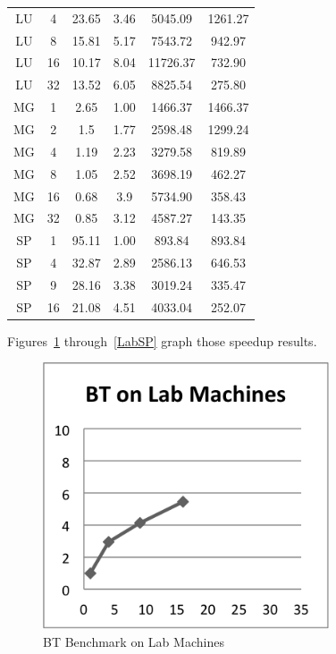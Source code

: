 \documentclass{acm_proc_article-sp}
\begin{document}
\begin{table}[tbp]
\begin{tabular}{ c | c || c | c | c | c }
    LU    & 4     & 23.65 & 3.46  & 5045.09 & 1261.27 \\
    LU    & 8     & 15.81 & 5.17  & 7543.72 & 942.97 \\
    LU    & 16    & 10.17 & 8.04  & 11726.37 & 732.90 \\
    LU    & 32    & 13.52 & 6.05  & 8825.54 & 275.80 \\
    MG    & 1     & 2.65  & 1.00     & 1466.37 & 1466.37 \\
    MG    & 2     & 1.5   & 1.77  & 2598.48 & 1299.24 \\
    MG    & 4     & 1.19  & 2.23  & 3279.58 & 819.89 \\
    MG    & 8     & 1.05  & 2.52  & 3698.19 & 462.27 \\
    MG    & 16    & 0.68  & 3.9   & 5734.90 & 358.43 \\
    MG    & 32    & 0.85  & 3.12  & 4587.27 & 143.35 \\
    SP    & 1     & 95.11 & 1.00     & 893.84 & 893.84 \\
    SP    & 4     & 32.87 & 2.89  & 2586.13 & 646.53 \\
    SP    & 9     & 28.16 & 3.38  & 3019.24 & 335.47 \\
    SP    & 16    & 21.08 & 4.51  & 4033.04 & 252.07 \\
\end{tabular}
\end{table}


Figures~\ref{LabBT} through~\ref{LabSP} graph those speedup results.

\begin{figure}[tbp]
  \centering
  \caption{BT Benchmark on Lab Machines}
	\label{LabBT}
  \includegraphics[width=20pc]{Pics-Lab/BT.png}
\end{figure}
\end{document}

